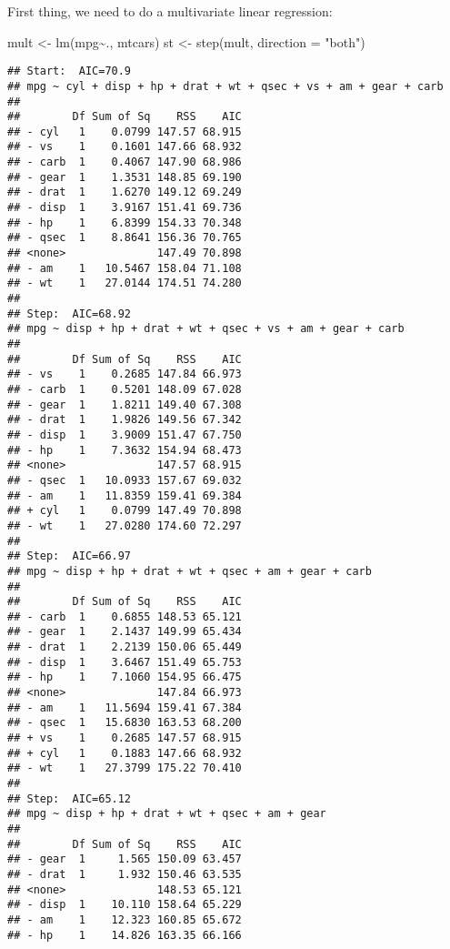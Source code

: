 \documentclass[
]{article}
\newenvironment{Shaded}{\begin{snugshade}}{\end{snugshade}}
\newcommand{\AttributeTok}[1]{\textcolor[rgb]{0.77,0.63,0.00}{#1}}
\newcommand{\FunctionTok}[1]{\textcolor[rgb]{0.00,0.00,0.00}{#1}}
\newcommand{\NormalTok}[1]{#1}
\newcommand{\OtherTok}[1]{\textcolor[rgb]{0.56,0.35,0.01}{#1}}
\newcommand{\SpecialCharTok}[1]{\textcolor[rgb]{0.00,0.00,0.00}{#1}}
\newcommand{\StringTok}[1]{\textcolor[rgb]{0.31,0.60,0.02}{#1}}
\begin{document}
First thing, we need to do a multivariate linear regression:

\begin{Shaded}
\begin{Highlighting}[]
\NormalTok{mult }\OtherTok{\textless{}{-}} \FunctionTok{lm}\NormalTok{(mpg}\SpecialCharTok{\textasciitilde{}}\NormalTok{., mtcars)}
\NormalTok{st }\OtherTok{\textless{}{-}} \FunctionTok{step}\NormalTok{(mult, }\AttributeTok{direction =} \StringTok{"both"}\NormalTok{)}
\end{Highlighting}
\end{Shaded}

\begin{verbatim}
## Start:  AIC=70.9
## mpg ~ cyl + disp + hp + drat + wt + qsec + vs + am + gear + carb
## 
##        Df Sum of Sq    RSS    AIC
## - cyl   1    0.0799 147.57 68.915
## - vs    1    0.1601 147.66 68.932
## - carb  1    0.4067 147.90 68.986
## - gear  1    1.3531 148.85 69.190
## - drat  1    1.6270 149.12 69.249
## - disp  1    3.9167 151.41 69.736
## - hp    1    6.8399 154.33 70.348
## - qsec  1    8.8641 156.36 70.765
## <none>              147.49 70.898
## - am    1   10.5467 158.04 71.108
## - wt    1   27.0144 174.51 74.280
## 
## Step:  AIC=68.92
## mpg ~ disp + hp + drat + wt + qsec + vs + am + gear + carb
## 
##        Df Sum of Sq    RSS    AIC
## - vs    1    0.2685 147.84 66.973
## - carb  1    0.5201 148.09 67.028
## - gear  1    1.8211 149.40 67.308
## - drat  1    1.9826 149.56 67.342
## - disp  1    3.9009 151.47 67.750
## - hp    1    7.3632 154.94 68.473
## <none>              147.57 68.915
## - qsec  1   10.0933 157.67 69.032
## - am    1   11.8359 159.41 69.384
## + cyl   1    0.0799 147.49 70.898
## - wt    1   27.0280 174.60 72.297
## 
## Step:  AIC=66.97
## mpg ~ disp + hp + drat + wt + qsec + am + gear + carb
## 
##        Df Sum of Sq    RSS    AIC
## - carb  1    0.6855 148.53 65.121
## - gear  1    2.1437 149.99 65.434
## - drat  1    2.2139 150.06 65.449
## - disp  1    3.6467 151.49 65.753
## - hp    1    7.1060 154.95 66.475
## <none>              147.84 66.973
## - am    1   11.5694 159.41 67.384
## - qsec  1   15.6830 163.53 68.200
## + vs    1    0.2685 147.57 68.915
## + cyl   1    0.1883 147.66 68.932
## - wt    1   27.3799 175.22 70.410
## 
## Step:  AIC=65.12
## mpg ~ disp + hp + drat + wt + qsec + am + gear
## 
##        Df Sum of Sq    RSS    AIC
## - gear  1     1.565 150.09 63.457
## - drat  1     1.932 150.46 63.535
## <none>              148.53 65.121
## - disp  1    10.110 158.64 65.229
## - am    1    12.323 160.85 65.672
## - hp    1    14.826 163.35 66.166

\end{verbatim}
\end{document}
